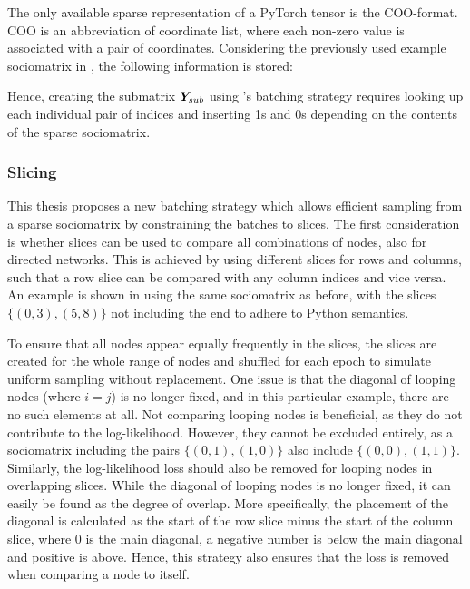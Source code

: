         The only available sparse representation of a PyTorch tensor is the COO-format. COO is an abbreviation of coordinate list, where each non-zero value is associated with a pair of coordinates. Considering the previously used example sociomatrix in , the following information is stored:
        
        Hence, creating the submatrix $\bm{Y}_{sub}$ using \citeauthor{jacobsen2018a}'s batching strategy requires looking up each individual pair of indices and inserting 1s and 0s depending on the contents of the sparse sociomatrix.
    
    \subsubsection{Slicing}
    
        This thesis proposes a new batching strategy which allows efficient sampling from a sparse sociomatrix by constraining the batches to slices. The first consideration is whether slices can be used to compare all combinations of nodes, also for directed networks.
        This is achieved by using different slices for rows and columns, such that a row slice can be compared with any column indices and vice versa. An example is shown in  using the same sociomatrix as before, with the slices $\{(0,3), (5,8)\}$ not including the end to adhere to Python semantics.
        
        To ensure that all nodes appear equally frequently in the slices, the slices are created for the whole range of nodes and shuffled for each epoch to simulate uniform sampling without replacement.
        One issue is that the diagonal of looping nodes (where $i=j$) is no longer fixed, and in this particular example, there are no such elements at all. Not comparing looping nodes is beneficial, as they do not contribute to the log-likelihood. However, they cannot be excluded entirely, as a sociomatrix including the pairs $\{(0,1), (1,0)\}$ also include $\{(0,0), (1,1)\}$. Similarly, the log-likelihood loss should also be removed for looping nodes in overlapping slices.
        While the diagonal of looping nodes is no longer fixed, it can easily be found as the degree of overlap. More specifically, the placement of the diagonal is calculated as the start of the row slice minus the start of the column slice, where 0 is the main diagonal, a negative number is below the main diagonal and positive is above. Hence, this strategy also ensures that the loss is removed when comparing a node to itself.
        
